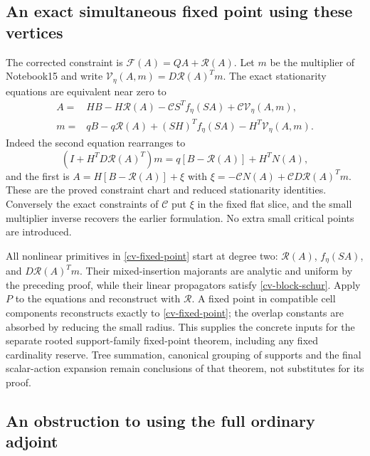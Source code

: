 \subsection{An exact simultaneous fixed point using these vertices}
\label{cv-fixed-point-section}

The corrected constraint is $\mathcal F(A)=QA+\mathcal R(A)$.
Let $m$ be the multiplier of Notebook15 and write
$\mathcal V_\eta(A,m)=D\mathcal R(A)^Tm$.
The exact stationarity equations are equivalent near zero to
\begin{equation}\label{cv-fixed-point}
 \begin{split}
 A={}&HB-H\mathcal R(A)
          -\mathcal CS^Tf_\eta(SA)+\mathcal C\mathcal V_\eta(A,m),\\
 m={}&qB-q\mathcal R(A)
          +(SH)^Tf_\eta(SA)-H^T\mathcal V_\eta(A,m).
 \end{split}
\end{equation}
Indeed the second equation rearranges to
\[
 (I+H^TD\mathcal R(A)^T)m
        =q[B-\mathcal R(A)]+H^TN(A),
\]
and the first is $A=H[B-\mathcal R(A)]+\xi$ with
$\xi=-\mathcal CN(A)+\mathcal CD\mathcal R(A)^Tm$.
These are the proved constraint chart and reduced
stationarity identities. Conversely the exact constraints
of $\mathcal C$ put $\xi$ in the fixed flat slice, and the
small multiplier inverse recovers the earlier formulation.
No extra small critical points are introduced.

All nonlinear primitives in \eqref{cv-fixed-point} start at
degree two: $\mathcal R(A)$, $f_\eta(SA)$, and
$D\mathcal R(A)^Tm$. Their mixed-insertion majorants are
analytic and uniform by the preceding proof, while their
linear propagators satisfy \eqref{cv-block-schur}.
Apply $P$ to the equations and reconstruct with $\mathscr R$.
A fixed point in compatible cell components reconstructs
exactly to \eqref{cv-fixed-point}; the overlap constants are
absorbed by reducing the small radius. This supplies the
concrete inputs for the separate rooted support-family
fixed-point theorem, including any fixed cardinality reserve.
Tree summation, canonical grouping of supports and the final
scalar-action expansion remain conclusions of that theorem,
not substitutes for its proof.

\subsection{An obstruction to using the full ordinary adjoint}
\label{cv-ordinary-section}

